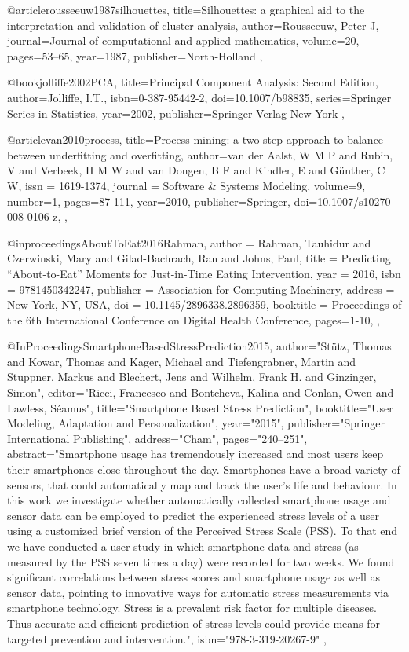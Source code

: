 @article{rousseeuw1987silhouettes,
  title={Silhouettes: a graphical aid to the interpretation and validation of cluster analysis},
  author={Rousseeuw, Peter J},
  journal={Journal of computational and applied mathematics},
  volume={20},
  pages={53--65},
  year={1987},
  publisher={North-Holland}
},

@book{jolliffe2002PCA,
  title={Principal Component Analysis: Second Edition},
  author={Jolliffe, I.T.},
  isbn={0-387-95442-2},
  doi={10.1007/b98835},
  series={Springer Series in Statistics},
  year={2002},
  publisher={Springer-Verlag New York}
},

@article{van2010process,
  title={Process mining: a two-step approach to balance between underfitting and overfitting},
  author={van der Aalst, W M P and Rubin, V and Verbeek, H M W and van Dongen, B F and Kindler, E and G{\"{u}}nther, C W},
  issn = {1619-1374},
  journal = {Software {\&} Systems Modeling},
  volume={9},
  number={1},
  pages={87-111},
  year={2010},
  publisher={Springer},
  doi={10.1007/s10270-008-0106-z},
},


@inproceedings{AboutToEat2016Rahman, 
  author = {Rahman, Tauhidur and Czerwinski, Mary and Gilad-Bachrach, Ran and Johns, Paul}, 
  title = {Predicting \enquote{About-to-Eat} Moments for Just-in-Time Eating Intervention}, 
  year = {2016}, 
  isbn = {9781450342247}, 
  publisher = {Association for Computing Machinery}, 
  address = {New York, NY, USA}, 
  doi = {10.1145/2896338.2896359}, 
  booktitle = {Proceedings of the 6th International Conference on Digital Health Conference},
  pages={1-10},
},

@InProceedings{SmartphoneBasedStressPrediction2015,
  author="St{\"u}tz, Thomas
  and Kowar, Thomas
  and Kager, Michael
  and Tiefengrabner, Martin
  and Stuppner, Markus
  and Blechert, Jens
  and Wilhelm, Frank H.
  and Ginzinger, Simon",
  editor="Ricci, Francesco
  and Bontcheva, Kalina
  and Conlan, Owen
  and Lawless, S{\'e}amus",
  title="Smartphone Based Stress Prediction",
  booktitle="User Modeling, Adaptation and Personalization",
  year="2015",
  publisher="Springer International Publishing",
  address="Cham",
  pages="240--251",
  abstract="Smartphone usage has tremendously increased and most users keep their smartphones close throughout the day. Smartphones have a broad variety of sensors, that could automatically map and track the user's life and behaviour. In this work we investigate whether automatically collected smartphone usage and sensor data can be employed to predict the experienced stress levels of a user using a customized brief version of the Perceived Stress Scale (PSS). To that end we have conducted a user study in which smartphone data and stress (as measured by the PSS seven times a day) were recorded for two weeks. We found significant correlations between stress scores and smartphone usage as well as sensor data, pointing to innovative ways for automatic stress measurements via smartphone technology. Stress is a prevalent risk factor for multiple diseases. Thus accurate and efficient prediction of stress levels could provide means for targeted prevention and intervention.",
  isbn="978-3-319-20267-9"
},

